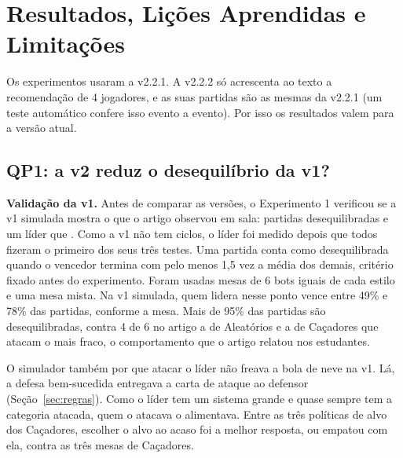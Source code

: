 \section{Resultados, Lições Aprendidas e Limitações}
\label{sec:resultados}

Os experimentos usaram a v2.2.1. A v2.2.2 só acrescenta ao texto a recomendação de 4 jogadores, e as suas
partidas são as mesmas da v2.2.1 (um teste automático confere isso evento a evento). Por isso os resultados
valem para a versão atual.

\subsection{QP1: a v2 reduz o desequilíbrio da v1?}
\label{sec:qp1}

\textbf{Validação da v1.} Antes de comparar as versões, o Experimento 1 verificou se a v1 simulada mostra o que o
artigo observou em sala: partidas desequilibradas e um líder que . Como a v1 não
tem ciclos, o líder foi
medido depois que todos fizeram o primeiro dos seus três testes. Uma partida conta como desequilibrada quando o
vencedor termina com pelo menos 1,5 vez a média dos demais, critério fixado antes do experimento. Foram usadas
mesas de 6 bots iguais de cada estilo e uma mesa mista.
Na v1 simulada, quem lidera nesse ponto vence entre 49\% e 78\% das partidas, conforme a mesa. Mais de 95\% das
partidas são desequilibradas, contra 4 de 6 no artigo a
de Aleatórios e a de Caçadores que atacam o mais fraco, o comportamento que o artigo relatou nos estudantes.

O simulador também  por que atacar o líder não freava a bola de neve na v1. Lá, a defesa bem-sucedida
entregava a carta de ataque ao defensor (Seção~\ref{sec:regras}). Como o líder tem um sistema grande e quase
sempre tem a categoria atacada, quem o atacava o alimentava. Entre as três políticas de alvo dos Caçadores,
escolher o alvo ao acaso foi a melhor resposta, ou empatou com ela, contra as três mesas de Caçadores.

